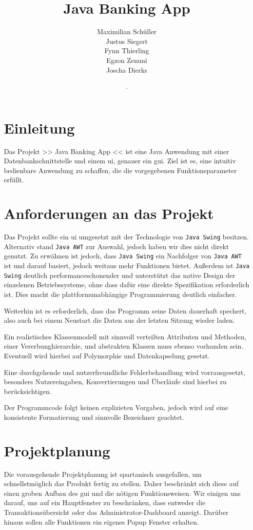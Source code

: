 \documentclass[
	12pt,
	a4paper,
	hidelinks
	]{report}
\title{Java Banking App}
\author{Maximilian Schüller \\ Justus Siegert \\ Fynn Thierling \\ Egzon Zenuni \\ Joscha Dierks }
\date{\the\day. \monthword{\month} \the\year}
\newcommand{\code}[1]{\texttt{#1}}
\begin{document}
\maketitle
\tableofcontents
\newpage

\section{Einleitung}
Das Projekt >> Java Banking App << ist eine Java Anwendung mit einer Datenbankschnittstelle und einem \ac{ui}, genauer ein \ac{gui}. Ziel ist es, eine intuitiv bedienbare Anwendung zu schaffen, die die vorgegebenen Funktionsparameter erfüllt.

\section{Anforderungen an das Projekt}
Das Projekt sollte ein \ac{ui} umgesetzt mit der Technologie von \code{Java Swing} besitzen. Alternativ stand \code{Java AWT} zur Auswahl, jedoch haben wir dies nicht direkt genutzt. Zu erwähnen ist jedoch, dass \code{Java Swing} ein Nachfolger von \code{Java AWT} ist und darauf basiert, jedoch weitaus mehr Funktionen bietet. Außerdem ist \code{Java Swing} deutlich performanceschonender und unterstützt das native Design der einzelenen Betriebssysteme, ohne dass dafür eine direkte Spezifikation erforderlich ist. Dies macht die plattformunabhängige Programmierung deutlich einfacher.

Weiterhin ist es erforderlich, dass das Programm seine Daten dauerhaft spechert, also auch bei einem Neustart die Daten aus der letzten Sitzung wieder laden.

Ein realistisches Klassenmodell mit sinnvoll verteilten Attributen und Methoden, einer Vererbunghierarchie, und abstrakten Klassen muss ebenso vorhanden sein. Eventuell wird hierbei auf Polymorphie und Datenkapselung gesetzt.

Eine durchgehende und nutzerfreundliche Fehlerbehandlung wird vorrausgesetzt, besonders Nutzereingaben, Konvertierungen und Überläufe sind hierbei zu berücksichtigen.

Der Programmcode folgt keinen explizieten Vorgaben, jedoch wird auf eine konsistente Formatierung und sinnvolle Bezeichner geachtet.

\section{Projektplanung}
Die vorausgehende Projektplanung ist spartanisch ausgefallen, um schnellstmöglich das Produkt fertig zu stellen. Daher beschränkt sich diese auf einen groben Aufbau des \ac{gui} und die nötigen Funktionsweisen. Wir einigen uns darauf, uns auf ein Hauptfenster zu beschränken, dass entweder die Transaktionsübersicht oder das Administrator-Dashboard anzeigt. Darüber hinaus sollen alle Funktionen ein eigenes Popup Fenster erhalten.
\end{document}
